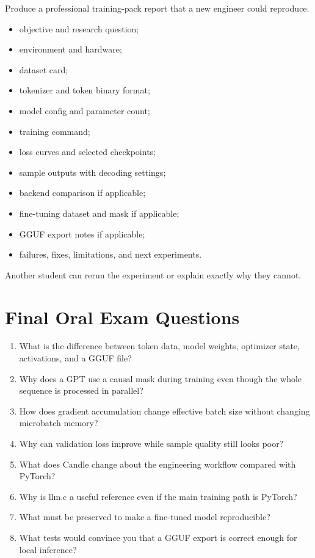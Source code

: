  Produce a professional training-pack report that a new engineer could reproduce.


\begin{itemize}
  \item objective and research question;
  \item environment and hardware;
  \item dataset card;
  \item tokenizer and token binary format;
  \item model config and parameter count;
  \item training command;
  \item loss curves and selected checkpoints;
  \item sample outputs with decoding settings;
  \item backend comparison if applicable;
  \item fine-tuning dataset and mask if applicable;
  \item GGUF export notes if applicable;
  \item failures, fixes, limitations, and next experiments.
\end{itemize}

 Another student can rerun the experiment or explain exactly why they cannot.

\section{Final Oral Exam Questions}

\begin{enumerate}
  \item What is the difference between token data, model weights, optimizer state, activations, and a GGUF file?
  \item Why does a GPT use a causal mask during training even though the whole sequence is processed in parallel?
  \item How does gradient accumulation change effective batch size without changing microbatch memory?
  \item Why can validation loss improve while sample quality still looks poor?
  \item What does Candle change about the engineering workflow compared with PyTorch?
  \item Why is llm.c a useful reference even if the main training path is PyTorch?
  \item What must be preserved to make a fine-tuned model reproducible?
  \item What tests would convince you that a GGUF export is correct enough for local inference?
\end{enumerate}

